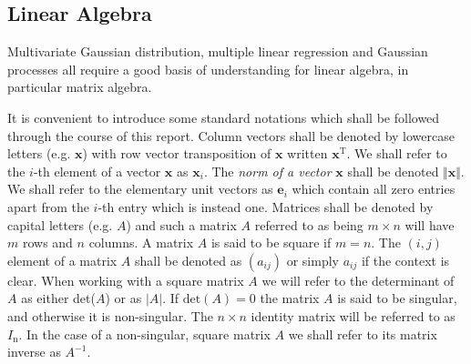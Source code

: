\documentclass[10pt,a4paper]{article}
\numberwithin{equation}{section}
\theoremstyle{plain}
\newcommand{\vect}[1]{\textbf{#1}}
\theoremstyle{own}
\begin{document}
\subsection{Linear Algebra}
Multivariate Gaussian distribution, multiple linear regression and Gaussian processes all require a good basis of understanding for linear algebra, in particular matrix algebra.

It is convenient to introduce some standard notations which shall be followed through the course of this report. Column vectors shall be denoted by lowercase letters (e.g. $\vect{x}$) with row vector transposition of $\vect{x}$ written $\vect{x}^\text{T}$. We shall refer to the $i$-th element of a vector $\vect{x}$ as $\vect{x}_i$. The \textit{norm of a vector} $\vect{x}$ shall be denoted $\Vert \vect{x} \Vert$. We shall refer to the elementary unit vectors as $\textbf{e}_i$ which contain all zero entries apart from the $i$-th entry which is instead one.
Matrices shall be denoted by capital letters (e.g. $A$) and such a matrix $A$ referred to as being $m \times n$ will have $m$ rows and $n$ columns. A matrix $A$ is said to be square if $m = n$. The $(i,j)$ element of a matrix $A$ shall be denoted as $(a_{ij})$ or simply $a_{ij}$ if the context is clear. When working with a square matrix $A$ we will refer to the determinant of $A$ as either det($A$) or as $\left|A\right|$. If $\text{det}(A)=0$ the matrix $A$ is said to be singular, and otherwise it is non-singular. The $n\times n$ identity matrix will be referred to as $I_\text{n}$. In the case of a non-singular, square matrix $A$ we shall refer to its matrix inverse as $A^{-1}$.
\end{document}
